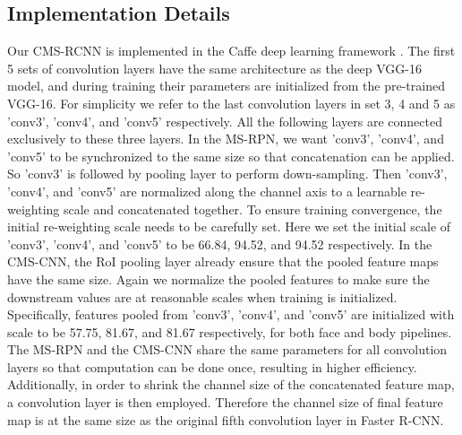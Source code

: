 \documentclass[10pt,journal,cspaper,compsoc]{IEEEtran}
\begin{document}
\subsection{Implementation Details}
\label{subsec:details}
Our CMS-RCNN is implemented in the Caffe deep learning framework \cite{jia2014caffe}. The first 5 sets of convolution layers have the same architecture as the deep VGG-16 model, and during training their parameters are initialized from the pre-trained VGG-16. For simplicity we refer to the last convolution layers in set 3, 4 and 5 as 'conv3', 'conv4', and 'conv5' respectively. All the following layers are connected exclusively to these three layers.
In the MS-RPN, we want 'conv3', 'conv4', and 'conv5' to be synchronized to the same size so that concatenation can be applied. So 'conv3' is followed by pooling layer to perform down-sampling. Then 'conv3', 'conv4', and 'conv5' are normalized along the channel axis to a learnable re-weighting scale and concatenated together. To ensure training convergence, the initial re-weighting scale needs to be carefully set. Here we set the initial scale of 'conv3', 'conv4', and 'conv5' to be 66.84, 94.52, and 94.52 respectively. 
In the CMS-CNN, the RoI pooling layer already ensure that the pooled feature maps have the same size. Again we normalize the pooled features to make sure the downstream values are at reasonable scales when training is initialized. Specifically, features pooled from 'conv3', 'conv4', and 'conv5' are initialized with scale to be 57.75, 81.67, and 81.67 respectively, for both face and body pipelines.
The MS-RPN and the CMS-CNN share the same parameters for all convolution layers so that computation can be done once, resulting in higher efficiency. Additionally, in order to shrink the channel size of the concatenated feature map, a  convolution layer is then employed. Therefore the channel size of final feature map is at the same size as the original fifth convolution layer in Faster R-CNN.
\end{document}
